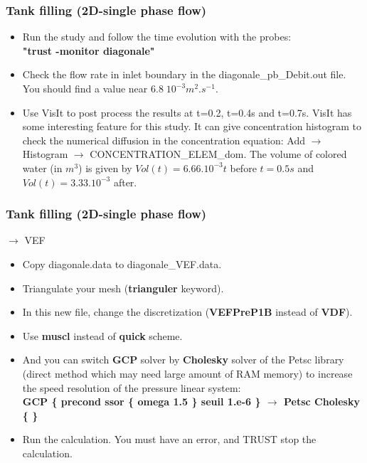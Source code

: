 \documentclass[10pt]{beamer}
\begin{document}
\begin{frame}
\frametitle{Tank filling (2D-single phase flow)}
\begin{block}{}

\begin{itemize}
\item Run the study and follow the time evolution with the probes:\\
\textbf{"trust -monitor diagonale"}
\item Check the flow rate in inlet boundary in the diagonale\_pb\_Debit.out file. You should find a value near $6.8 \; 10^{-3} m^2.s^{-1}$.

\item Use VisIt to post process the results at t=0.2, t=0.4s and t=0.7s. VisIt has some interesting feature for this study. It can give concentration histogram to check the numerical diffusion in the concentration equation: Add $\rightarrow$ Histogram $\rightarrow$ CONCENTRATION\_ELEM\_dom.
The volume of colored water (in $m^3$) is given by $Vol(t)= 6.66.10^{-3} t$ before $t=0.5s$ and $Vol(t)=3.33.10^{-3}$ after.
\end{itemize}

\end{block}
\end{frame}
\begin{frame}
\frametitle{Tank filling (2D-single phase flow)}
\begin{block}{$\rightarrow$ VEF}

\begin{itemize}
\item Copy diagonale.data to diagonale\_VEF.data.
\item Triangulate your mesh (\textbf{trianguler} keyword).
\item In this new file, change the discretization (\textbf{VEFPreP1B} instead of \textbf{VDF}).
\item Use \textbf{muscl} instead of \textbf{quick} scheme.
\item And you can switch \textbf{GCP} solver by \textbf{Cholesky} solver of the Petsc library (direct method which may need large amount of RAM memory) to increase the speed resolution of the pressure linear system:\\
\textbf{GCP \{ precond ssor \{ omega 1.5 \} seuil 1.e-6 \} $\rightarrow$ Petsc Cholesky \{ \}}
\item Run the calculation. You must have an error, and TRUST stop the calculation. 
\end{itemize}

\end{block}
\end{frame}
\end{document}
